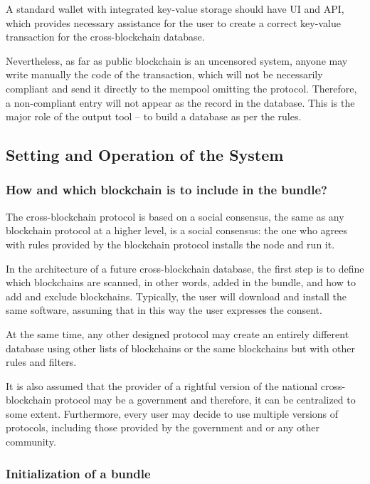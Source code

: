 \begin{multicols}{2}
A standard wallet with integrated key-value storage should have UI and API, which provides necessary assistance for the user to create a correct key-value transaction for the cross-blockchain database.

Nevertheless, as far as public blockchain is an uncensored system, anyone may write manually the code of the transaction, which will not be necessarily compliant and send it directly to the mempool omitting the protocol. Therefore, a non-compliant entry will not appear as the record in the database. This is the major role of the output tool – to build a database as per the rules.

\subsection{Setting and Operation of the System}\label{subsec-4.2}

\subsubsection{How and which blockchain is to include in the bundle?}\label{subsubsec-4.2.1}

The cross-blockchain protocol is based on a social consensus, the same as any blockchain protocol at a higher level, is a social consensus: the one who agrees with rules provided by the blockchain protocol installs the node and run it.

In the architecture of a future cross-blockchain database, the first step is to define which blockchains are scanned, in other words, added in the bundle, and how to add and exclude blockchains. Typically, the user will download and install the same software, assuming that in this way the user expresses the consent.

At the same time, any other designed protocol may create an entirely different database using other lists of blockchains or the same blockchains but with other rules and filters.

It is also assumed that the provider of a rightful version of the national cross-blockchain protocol may be a government and therefore, it can be centralized to some extent. Furthermore, every user may decide to use multiple versions of protocols, including those provided by the government and or any other community.

\subsubsection{Initialization of a bundle}\label{subsubsec-4.2.2}


\end{multicols}
